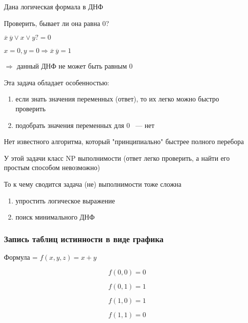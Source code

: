 \documentclass[russian]{lecture-notes}
\begin{document}
\begin{sloppypar}
Дана логическая формала в ДНФ

	Проверить, бывает ли она равна 0?

$\overline{x} \: \overline{y} \lor x \lor y  ?= 0$

$x = 0, y = 0 \Rightarrow \overline{x} \: \overline{y} = 1$

$\Rightarrow$ данный ДНФ не может быть равным 0

	Эта задача обладает особенностью:

\begin{enumerate}
	\item если знать значения переменных (ответ), то их легко можно быстро проверить
	\item подобрать значения переменных для 0 ~--- нет
\end{enumerate}

	Нет известного алгоритма, который "принципиально" быстрее полного перебора

У этой задачи класс NP выполнимости (ответ легко проверить, а найти его простым способом невозможно)

\begin{corollary}
	То к чему сводится задача (не) выполнимости тоже сложна
	\begin{enumerate}
		\item упростить логическое выражение
		\item поиск минимального ДНФ
	\end{enumerate}
\end{corollary}

\subsubsection{Запись таблиц истинности в виде графика}

	Формула  = $f(x, y, z) = x + y$

	$$f(0, 0) = 0$$
	
	$$f(0, 1) = 1$$
	
	$$f(1, 0) = 1$$
	
	$$f(1, 1) = 0$$

\end{sloppypar}
\end{document}

